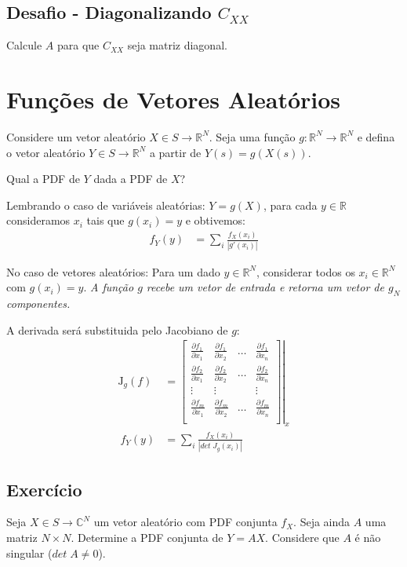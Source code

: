 \documentclass{article}
\renewcommand\it[1]{\textit{#1}}
\begin{document}
\subsection{Desafio - Diagonalizando $C_{XX}$}
Calcule $A$ para que $C_{XX}$ seja matriz diagonal.

\section{Funções de Vetores Aleatórios}
Considere um vetor aleatório $X \in S \to \mathbb{R}^N$. Seja uma função $g: \mathbb{R}^N \to
\mathbb{R}^N$ e defina o vetor aleatório $Y \in S \to \mathbb{R}^N$ a partir de $Y(s) = g(X(s))$.

Qual a PDF de $Y$ dada a PDF de $X$?

Lembrando o caso de variáveis aleatórias: $Y = g(X)$, para cada $y \in \mathbb{R}$ consideramos
$x_i$ tais que $g(x_i) = y$ e obtivemos:
\begin{align*}
    f_Y(y) &= \sum_i \frac{f_X(x_i)}{|g'(x_i)|}
\end{align*}

No caso de vetores aleatórios:
Para um dado $y \in \mathbb{R}^N$, considerar todos os $x_i \in \mathbb{R}^N$ com $g(x_i) = y$.
\it{A função $g$ recebe um vetor de entrada e retorna um vetor de $g_N$ componentes.}

A derivada será substituida pelo Jacobiano de $g$:
\begin{align*}
    \mathrm{J}_g(f)&=\left.\begin{bmatrix}\frac{\partial f_1}{\partial x_1}&\frac{\partial f_1}{\partial x_2}&\dots&\frac{\partial f_1}{\partial x_n}\\\frac{\partial f_2}{\partial x_1}&\frac{\partial f_2}{\partial x_2}&\dots&\frac{\partial f_2}{\partial x_n}\\
\vdots&\vdots&&\vdots\\\frac{\partial f_m}{\partial x_1}&\frac{\partial f_m}{\partial
x_2}&\dots&\frac{\partial f_m}{\partial x_n}\\\end{bmatrix}\right|_x \\
\
            f_Y(y) &= \sum_i \frac{f_X(x_i)}{|det \; J_g(x_i)|}
\end{align*}

\subsection{Exercício}
Seja $X \in S \to \mathbb{C}^N$ um vetor aleatório com PDF conjunta $f_X$. Seja ainda $A$ uma
matriz $N \times N$. Determine a PDF conjunta de $Y = AX$. Considere que $A$ é não singular ($det
\; A \neq 0$).
\end{document}
